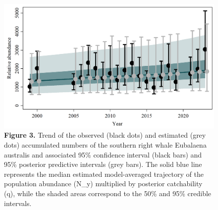 \documentclass[
]{article}
\begin{document}
\newpage

\begin{figure}
\centering
\includegraphics{Model runs/Model_average/Model_average_IOA_fit.png}
\caption{\textbf{Figure 3.} Trend of the observed (black dots) and
estimated (grey dots) accumulated numbers of the southern right whale
Eubalaena australis and associated 95\% confidence interval (black bars)
and 95\% posterior predictive intervals (grey bars). The solid blue line
represents the median estimated model-averaged trajectory of the
population abundance (N\_y) multiplied by posterior catchability (q),
while the shaded areas correspond to the 50\% and 95\% credible
intervals.}
\end{figure}

\newpage
\end{document}
